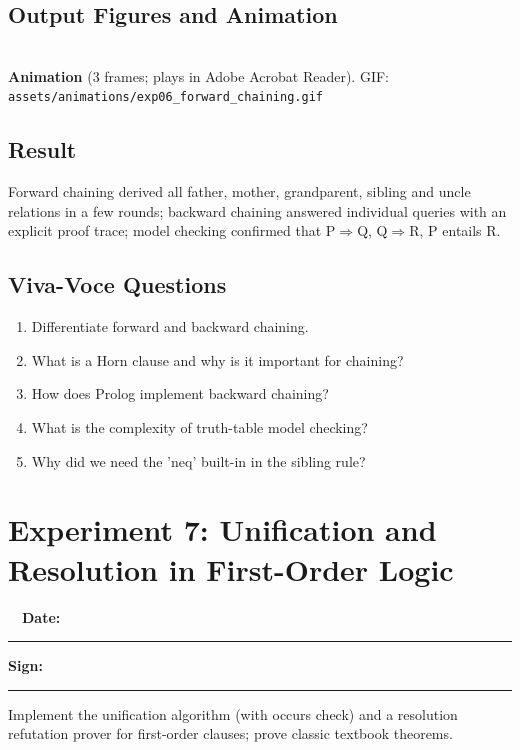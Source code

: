 \documentclass[11pt]{article}
\begin{document}
\subsection*{Output Figures and Animation}
\begin{center}
\\
{\small\color{slate}\textbf{Animation} (3 frames; plays in Adobe Acrobat Reader). GIF: \texttt{assets/animations/exp06\_forward\_chaining.gif}}
\end{center}
\subsection*{Result}
\begin{outcome}Forward chaining derived all father, mother, grandparent, sibling and uncle relations in a few rounds; backward chaining answered individual queries with an explicit proof trace; model checking confirmed that {P$\Rightarrow$Q, Q$\Rightarrow$R, P} entails R.\end{outcome}
\subsection*{Viva-Voce Questions}
\begin{enumerate}
\item Differentiate forward and backward chaining.
\item What is a Horn clause and why is it important for chaining?
\item How does Prolog implement backward chaining?
\item What is the complexity of truth-table model checking?
\item Why did we need the 'neq' built-in in the sibling rule?
\end{enumerate}
\newpage
\section*{Experiment 7: Unification and Resolution in First-Order Logic}\label{exp7}
\noindent{}\ \ \hfill\textbf{\color{navy}Date:}\ \rule{3cm}{0.4pt}\quad\textbf{\color{navy}Sign:}\ \rule{3cm}{0.4pt}\par\medskip
\begin{keypoint}[Aim]Implement the unification algorithm (with occurs check) and a resolution refutation prover for first-order clauses; prove classic textbook theorems.\end{keypoint}
\end{document}

